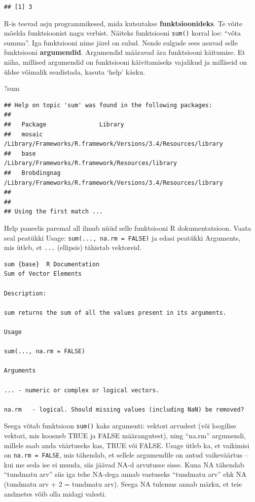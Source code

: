 \documentclass[]{book}
\newenvironment{Shaded}{\begin{snugshade}}{\end{snugshade}}
\newcommand{\NormalTok}[1]{#1}
\begin{document}
\begin{verbatim}
## [1] 3
\end{verbatim}

R-is teevad asju programmikesed, mida kutsutakse
\textbf{funktsioonideks}. Te võite mõelda funktsioonist nagu verbist.
Näiteks funktsiooni \texttt{sum()} korral loe: ``võta summa''. Iga
funktsiooni nime järel on sulud. Nende sulgude sees asuvad selle
funktsiooni \textbf{argumendid}. Argumendid määravad ära funktsiooni
käitumise. Et näha, millised argumendid on funktsiooni käivitamiseks
vajalikud ja milliseid on üldse võimalik seadistada, kasuta `help'
käsku.

\begin{Shaded}
\begin{Highlighting}[]
\NormalTok{?sum}
\end{Highlighting}
\end{Shaded}

\begin{verbatim}
## Help on topic 'sum' was found in the following packages:
## 
##   Package               Library
##   mosaic                /Library/Frameworks/R.framework/Versions/3.4/Resources/library
##   base                  /Library/Frameworks/R.framework/Resources/library
##   Brobdingnag           /Library/Frameworks/R.framework/Versions/3.4/Resources/library
## 
## 
## Using the first match ...
\end{verbatim}

Help paneelis paremal all ilmub nüüd selle funktsiooni R
dokumentatsioon. Vaata seal peatükki Usage:
\texttt{sum(...,\ na.rm\ =\ FALSE)} ja edasi peatükki Arguments, mis
ütleb, et \texttt{...} (ellipsis) tähistab vektoreid.

\begin{verbatim}
sum {base}  R Documentation 
Sum of Vector Elements

Description:

sum returns the sum of all the values present in its arguments.

Usage

sum(..., na.rm = FALSE)

Arguments

... - numeric or complex or logical vectors.

na.rm   - logical. Should missing values (including NaN) be removed?
\end{verbatim}

Seega võtab funktsioon \texttt{sum()} kaks argumenti: vektori arvudest
(või loogilise vektori, mis koosneb TRUE ja FALSE määrangutest), ning
``na.rm'' argumendi, millele saab anda väärtuseks kas, TRUE või FALSE.
Usage ütleb ka, et vaikimisi on \texttt{na.rm\ =\ FALSE}, mis tähendab,
et sellele argumendile on antud vaikeväärtus -- kui me seda ise ei
muuda, siis jäävad NA-d arvutusse sisse. Kuna NA tähendab ``tundmatu
arv'' siis iga tehe NA-dega annab vastuseks ``tundmatu arv'' ehk NA
(tundmatu arv + 2 = tundmatu arv). Seega NA tulemus annab märku, et teie
andmetes võib olla midagi valesti.
\end{document}
